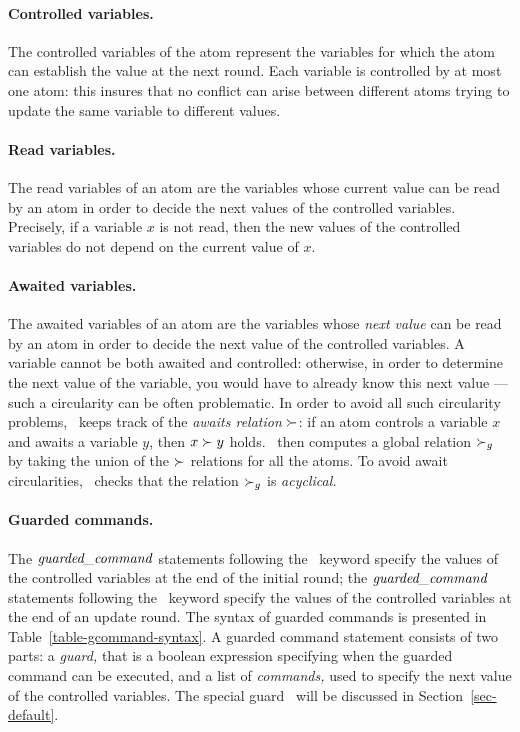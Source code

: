 \paragraph{Controlled variables.}

The controlled variables of the atom represent the
variables for which the atom can establish the value at the next
round.  Each variable is controlled by at most one atom: this insures
that no conflict can arise between different atoms trying to update
the same variable to different values. 


\paragraph{Read variables.}

The read variables of an atom are the variables whose current value
can be read by an atom in order to decide the next values of the
controlled variables.  Precisely, if a variable $x$ is not read, then
the new values of the controlled variables do not depend on the
current value of $x$. 


\paragraph{Awaited variables.}

The awaited variables of an atom are the variables whose {\em next
value\/} can be read by an atom in order to decide the next value of
the controlled variables.  A variable cannot be both awaited and
controlled: otherwise, in order to determine the next value of the
variable, you would have to already know this next value --- such a
circularity can be often problematic.  In order to avoid all such
circularity problems, \mocha\ keeps track of the {\em awaits
relation\/} $\succ$: if an atom controls a
variable $x$ and awaits a variable $y$, then $x \succ y$ holds.
\mocha\ then computes a global relation $\succ_g$ by taking the
union of the $\succ$ relations for all the atoms.  To avoid await
circularities, \mocha\ checks that the relation $\succ_g$ is {\em
acyclical.}


\paragraph{Guarded commands.}

The $\mbox{\it guarded\_command\/}$ statements following the \INIT\
keyword specify the values of the controlled
variables at the end of the initial round; the
$\mbox{\it guarded\_command\/}$ statements following the \UPDATE\
keyword specify the values of the controlled
variables at the end of an update round. The
syntax of guarded commands is presented in
Table~\ref{table-gcommand-syntax}.  A guarded command statement
consists of two parts: a {\em guard,} that is a boolean
expression specifying when the guarded command can be executed, and a
list of {\em commands,}\index{command} used to specify the next value
of the controlled variables.  The special guard
\DEFAULT\ will be discussed in Section~\ref{sec-default}.


